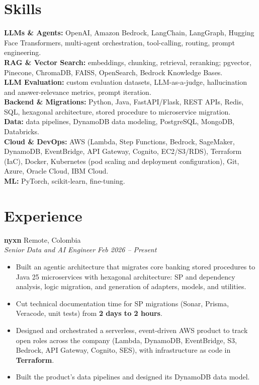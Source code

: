 \documentclass[letterpaper,10pt]{article}
\newcommand{\resumeItem}[1]{\item \small{#1}}
\newcommand{\resumeSubheading}[4]{%
  \textbf{#1} \hfill #2 \\
  \textit{\small #3} \hfill \textit{\small #4} \\
  \vspace{-2pt}
}
\newcommand{\betweenRoles}{\vspace{4pt}}
\begin{document}
\section{Skills}
\small
\textbf{LLMs \& Agents:} OpenAI, Amazon Bedrock, LangChain, LangGraph, Hugging Face Transformers, multi-agent orchestration, tool-calling, routing, prompt engineering. \\
\textbf{RAG \& Vector Search:} embeddings, chunking, retrieval, reranking; pgvector, Pinecone, ChromaDB, FAISS, OpenSearch, Bedrock Knowledge Bases. \\
\textbf{LLM Evaluation:} custom evaluation datasets, LLM-as-a-judge, hallucination and answer-relevance metrics, prompt iteration. \\
\textbf{Backend \& Migrations:} Python, Java, FastAPI/Flask, REST APIs, Redis, SQL, hexagonal architecture, stored procedure to microservice migration. \\
\textbf{Data:} data pipelines, DynamoDB data modeling, PostgreSQL, MongoDB, Databricks. \\
\textbf{Cloud \& DevOps:} AWS (Lambda, Step Functions, Bedrock, SageMaker, DynamoDB, EventBridge, API Gateway, Cognito, EC2/S3/RDS), Terraform (IaC), Docker, Kubernetes (pod scaling and deployment configuration), Git, Azure, Oracle Cloud, IBM Cloud. \\
\textbf{ML:} PyTorch, scikit-learn, fine-tuning. \\

\section{Experience}

\resumeSubheading
{nyxn}{Remote, Colombia}
{Senior Data and AI Engineer}{Feb 2026 -- Present}
\begin{itemize}
  \resumeItem{Built an agentic architecture that migrates core banking stored procedures to Java 25 microservices with hexagonal architecture: SP and dependency analysis, logic migration, and generation of adapters, models, and utilities.}
  \resumeItem{Cut technical documentation time for SP migrations (Sonar, Prisma, Veracode, unit tests) from \textbf{2 days to 2 hours}.}
  \resumeItem{Designed and orchestrated a serverless, event-driven AWS product to track open roles across the company (Lambda, DynamoDB, EventBridge, S3, Bedrock, API Gateway, Cognito, SES), with infrastructure as code in \textbf{Terraform}.}
  \resumeItem{Built the product's data pipelines and designed its DynamoDB data model.}
\end{itemize}
\betweenRoles
\end{document}
